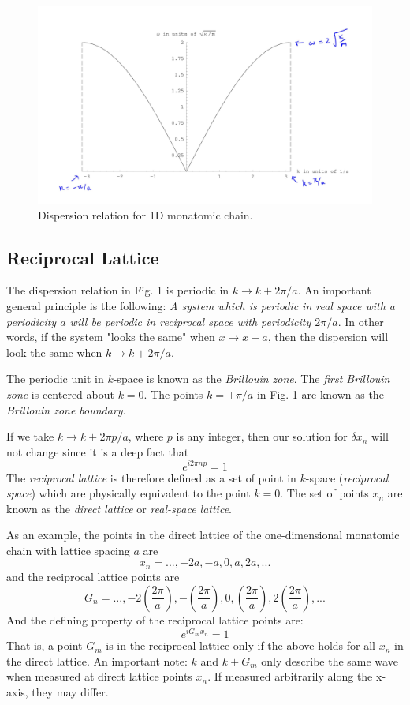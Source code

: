 \documentclass[10pt]{article}
\begin{document}
\begin{figure}
  \includegraphics[width=\linewidth]{1d_disp.png}
  \caption{Dispersion relation for 1D monatomic chain.}
\end{figure}

\subsection{Reciprocal Lattice}
The dispersion relation in Fig. 1 is periodic in $k \rightarrow k + 2\pi/a$. An important
general principle is the following: \emph{A system which is periodic in real space with a periodicity
$a$ will be periodic in reciprocal space with periodicity $2\pi/a$}. In other words, if the system "looks
the same" when $x \rightarrow x + a$, then the dispersion will look the same when $k \rightarrow k + 2\pi/a$.


The periodic unit in $k$-space is known as the \emph{Brillouin zone}. The \emph{first Brillouin zone} is centered about $k = 0$.
The points $k = \pm \pi/a$  in Fig. 1 are known as the \emph{Brillouin zone boundary}.


If we take $k \rightarrow k + 2\pi p/a$, where $p$ is any integer, then our solution for $\delta x_{n}$ will not change since it is
a deep fact that
$$e^{i2\pi n p} = 1$$
The \emph{reciprocal lattice} is therefore defined as a set of point in $k$-space (\emph{reciprocal space}) which are physically
equivalent to the point $k = 0$. The set of points $x_{n}$ are known as the \emph{direct lattice} or \emph{real-space lattice}.

As an example, the points in the direct lattice of the one-dimensional monatomic chain with lattice spacing $a$ are
$$x_{n} = ..., -2a, -a, 0, a, 2a, ...$$
and the reciprocal lattice points are
$$G_{n} = ..., -2\left (\frac{2\pi}{a} \right), -\left (\frac{2\pi}{a} \right), 0, \left (\frac{2\pi}{a} \right), 2\left (\frac{2\pi}{a} \right),... $$
And the defining property of the reciprocal lattice points are:
\begin{equation}
  \boxed{e^{iG_{m}x_{n}} = 1}
\end{equation}
That is, a point $G_{m}$ is in the reciprocal lattice only if the above holds for all $x_{n}$ in the direct lattice.
An important note: $k$ and $k+G_{m}$ only describe the same wave when measured at direct lattice points $x_{n}$. If measured arbitrarily
along the x-axis, they may differ.
\end{document}
